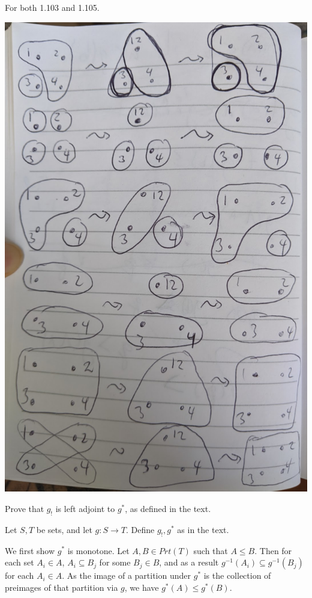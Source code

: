 \solution
For both 1.103 and 1.105.

\includegraphics[width=0.5\linewidth]{images/1-105.jpg}

Prove that $g_!$ is left adjoint to $g^*$, as defined in the text.

\solution

Let $S, T$ be sets, and let $g: S \to T$.  Define $g_{!}, g^{*}$ as in the text.  

We first show $g^{*}$ is monotone.  Let $A, B\in Prt(T)$ such that $A\leq B$.  Then for each set $A_i\in A$, $A_i \subseteq B_j$ for some $B_j\in B$, and as a result $g^{-1}(A_i)\subseteq g^{-1}(B_j)$ for each $A_i\in A$.  As the image of a partition under $g^*$ is the collection of preimages of that partition via $g$, we have $g^{*}(A)\leq g^{*}(B)$.

